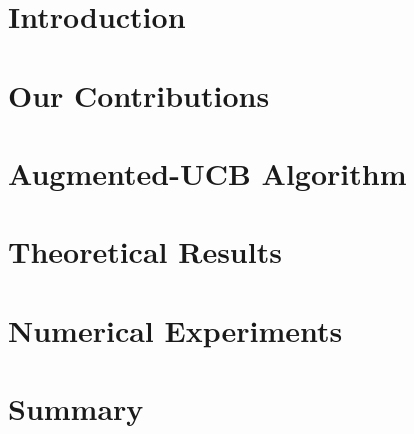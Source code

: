 \documentclass[MS,twoside]{iitmdiss}
\begin{document}
\section{Introduction}
\label{tbandit:intro2}



\section{Our Contributions}
\label{tbandit:contribution}



\section{Augmented-UCB Algorithm}
\label{tbandit:algorithm}



\section{Theoretical Results}
\label{tbandit:results}



\section{Numerical Experiments}
\label{tbandit:expt}



\section{Summary}
\label{tbandit:conclusion}



\end{document}
